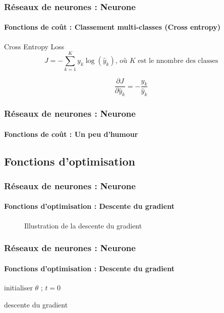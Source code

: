 \documentclass[xcolor=table]{beamer}
\begin{document}
\begin{frame}
\frametitle{Réseaux de neurones : Neurone}
\framesubtitle{Fonctions de coût : Classement multi-classes (Cross entropy)}

\begin{block}{Cross Entropy Loss}
	\[J = - \sum\limits_{k=1}^{K} y_{k} \log(\hat{y}_{k}) \text{, où } K \text{ est le nnombre des classes} \]
	
	\[
	\frac{\partial J}{\partial \hat{y}_k} = - \frac{y_{k}}{\hat{y}_{k}}
	\]
\end{block}


\end{frame}

\begin{frame}
	\frametitle{Réseaux de neurones : Neurone}
	\framesubtitle{Fonctions de coût : Un peu d'humour}
	
	\begin{center}
	\end{center}
	
\end{frame}

\subsection{Fonctions d'optimisation}

\begin{frame}
\frametitle{Réseaux de neurones : Neurone}
\framesubtitle{Fonctions d'optimisation : Descente du gradient}

\begin{figure}
	\caption{Illustration de la descente du gradient \cite{2020-calin}}
\end{figure}

\end{frame}

\begin{frame}
\frametitle{Réseaux de neurones : Neurone}
\framesubtitle{Fonctions d'optimisation : Descente du gradient}

\begin{algorithm}[H]
	\KwResult{$ \theta $}
	initialiser $ \theta $ ; $ t = 0 $\;
	\caption{descente du gradient}
\end{algorithm}

\end{frame}
\end{document}
